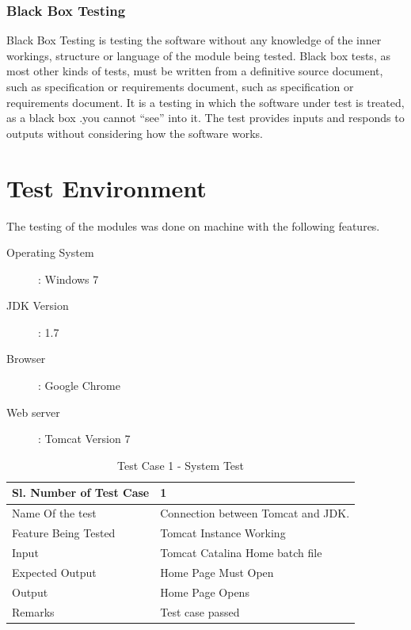 \documentclass[12pt,a4paper]{report}
\begin{document}
\subsubsection{Black Box Testing}
Black Box Testing is testing the software without any knowledge of the inner
workings, structure or language of the module being tested. Black box tests, as most
other kinds of tests, must be written from a definitive source document, such as
specification or requirements document, such as specification or requirements
document. It is a testing in which the software under test is treated, as a black box
.you cannot “see” into it. The test provides inputs and responds to outputs without
considering how the software works.
\section{Test Environment}
The testing of the modules was done on machine with the following features.
\begin{description}
  \item[Operating System ] : Windows 7 
  \item[JDK Version ] : 1.7 
  \item[Browser ] : Google Chrome 
  \item[Web server ]: Tomcat Version 7 
\end{description}
\newpage


\begin{table}
    \begin{tabular}{|l|l|}
    
    \hline
    Sl. Number of Test Case & 1                                  \\ \hline
    Name Of the test        & Connection between Tomcat and JDK. \\ \hline
    Feature Being Tested    & Tomcat Instance Working            \\ \hline
    Input                   & Tomcat Catalina Home batch file    \\ \hline
    Expected Output         & Home Page Must Open                \\ \hline
    Output                  & Home Page Opens                    \\ \hline
    Remarks                 & Test case passed                   \\ \hline
    \end{tabular}
    \caption {Test Case 1 - System Test}
\end{table}
\end{document}
